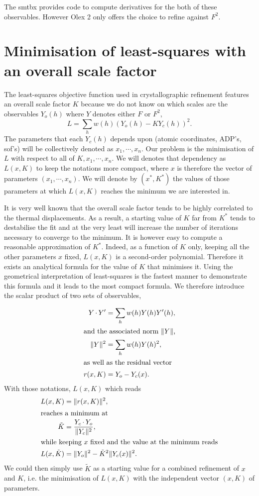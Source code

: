 \documentclass[pdf]{iucr}
\begin{document}
The smtbx provides code to compute derivatives for the both of these observables. However Olex 2 only offers the choice to refine against $F^2$.

\section{Minimisation of least-squares with an overall scale factor}

The least-squares objective function used in crystallographic refinement features an overall scale factor $K$ because we do not know on which scales are the observables $Y_o(h)$ where $Y$ denotes either $F$ or $F^2$,
\begin{equation}
L = \sum_h w(h) (Y_o(h) - K Y_c(h))^2.
\end{equation}
The parameters that each $Y_c(h)$ depends upon (atomic coordinates, ADP's, sof's) will be collectively denoted as $x_1, \cdots, x_n$. Our problem is the minimisation of $L$ with respect to all of $K, x_1, \cdots, x_n$. We will  denotes that dependency as $L(x, K)$ to keep the notations more compact, where $x$ is therefore the vector of parameters $(x_1, \cdots, x_n)$. We will denote by $(x^*, K^*)$ the values of those parameters at which $L(x,K)$ reaches the minimum we are interested in.

It is very well known that the overall scale factor tends to be highly correlated to the thermal displacements. As a result, a starting value of $K$ far from $K^*$ tends to destabilise the fit and at the very least will increase the number of iterations necessary to converge to the minimum. It is however easy to compute a reasonable approximation of $K^*$. Indeed, as a function of $K$ only, keeping all the other parameters $x$ fixed, $L(x, K)$ is a second-order polynomial. Therefore it exists an analytical formula for the value of $K$ that minimises it. Using the geometrical interpretation of least-squares is the fastest manner to demonstrate this formula and it leads to the most compact formula. We therefore introduce the scalar product of two sets of observables,

\begin{align}
Y \operatorname{\cdot} Y' &= \sum_h w(h) Y(h) Y'(h), \\
\intertext{and the associated norm $\| Y \|$,}
\| Y \|^2 &= \sum_h w(h) Y(h)^2, \\
\intertext{as well as the residual vector}
r(x, K) &= Y_o - Y_c(x).
\label{eqn:lsresidualdef}
\end{align}
With those notations, $L(x, K)$ which reads
\begin{align}
L(x, K) &= \| r(x, K) \|^2, \\
\intertext{reaches a minimum at}
\tilde{K} &= \frac{Y_c \operatorname{\cdot} Y_o}{\| Y_c \|^2},
\label{eqn:tildeK}
\\
\intertext{while keeping $x$ fixed and the value at the minimum reads}
L(x, \tilde{K}) &= \| Y_o \|^2 - \tilde{K}^2 \| Y_c(x) \|^2.
\end{align}
We could then simply use $\tilde{K}$ as a starting value for a combined refinement of $x$ and $K$, i.e. the minimisation of $L(x, K)$ with the independent vector $(x, K)$ of parameters.
\end{document}
